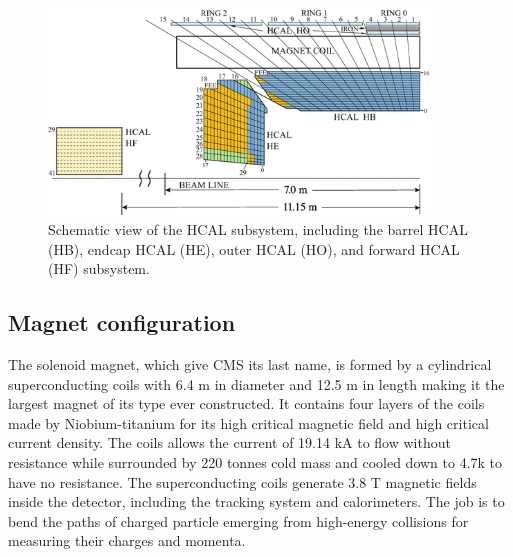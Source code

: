 \begin{figure}\centering
    \includegraphics[width=0.9\textwidth]{figure/cms_hcal.png}
    \caption[Schematic view of the HCAL subsystem.]
    {Schematic view of the HCAL subsystem, including the barrel HCAL (HB), endcap HCAL (HE), outer HCAL (HO), and forward HCAL (HF) subsystem.}
    \label{fig:cms_hcal}
\end{figure}

\subsection{Magnet configuration}
The solenoid magnet, which give CMS its last name, is formed by a cylindrical superconducting coils with 6.4 m in diameter and 12.5 m in length making it the largest magnet of its type ever constructed.
It contains four layers of the coils made by Niobium-titanium for its high critical magnetic field and high critical current density.
The coils allows the current of 19.14 kA to flow without resistance while surrounded by 220 tonnes cold mass and cooled down to 4.7k to have no resistance.
The superconducting coils generate 3.8 T magnetic fields inside the detector, including the tracking system and calorimeters.
The job is to bend the paths of charged particle emerging from high-energy collisions for measuring their charges and momenta.

